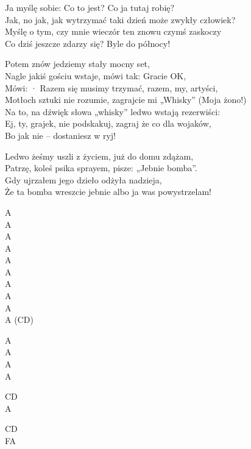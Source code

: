 \begin{text}
{Ja myślę sobie: Co to jest? Co ja tutaj robię?\\
Jak, no jak, jak wytrzymać taki dzień może zwykły człowiek?\\
Myślę o tym, czy mnie wieczór ten znowu czymś zaskoczy\\
Co dziś jeszcze zdarzy się? Byle do północy!

Potem znów jedziemy stały mocny set,\\
Nagle jakiś gościu wstaje, mówi tak: Gracie OK,\\
Mówi: · Razem się musimy trzymać, razem, my, artyści,\\
Motłoch sztuki nie rozumie, zagrajcie mi „Whisky” (Moja żono!)\\
Na to, na dźwięk słowa „whisky” ledwo wstają rezerwiści:\\
Ej, ty, grajek, nie podskakuj, zagraj że co dla wojaków,\\
Bo jak nie – dostaniesz w ryj!

Ledwo żeśmy uszli z życiem, już do domu zdążam,\\
Patrzę, koleś psika sprayem, pisze: „Jebnie bomba”.\\
Gdy ujrzałem jego dzieło odżyła nadzieja,\\
Że ta bomba wreszcie jebnie albo ja was powystrzelam!
}
\end{text}
\begin{chord}
    \small{
    A\\
    A\\
    A\\
    A\\
    A\\
    A\\
    A\\
    A\\
    A\\
    A (CD)

    A\\
    A\\
    A\\
    A

    CD\\
    A

    CD\\
    FA
    }
\end{chord}